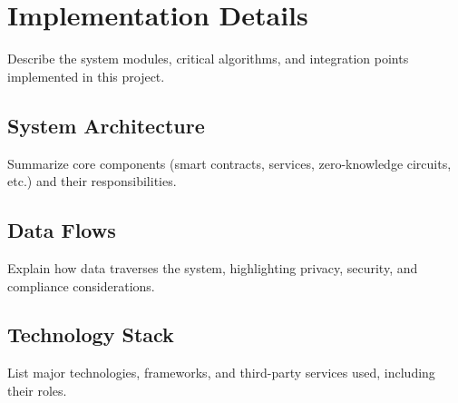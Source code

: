 \section{Implementation Details}

Describe the system modules, critical algorithms, and integration points implemented in this project.

\subsection{System Architecture}
Summarize core components (smart contracts, services, zero-knowledge circuits, etc.) and their responsibilities.

\subsection{Data Flows}
Explain how data traverses the system, highlighting privacy, security, and compliance considerations.

\subsection{Technology Stack}
List major technologies, frameworks, and third-party services used, including their roles.
